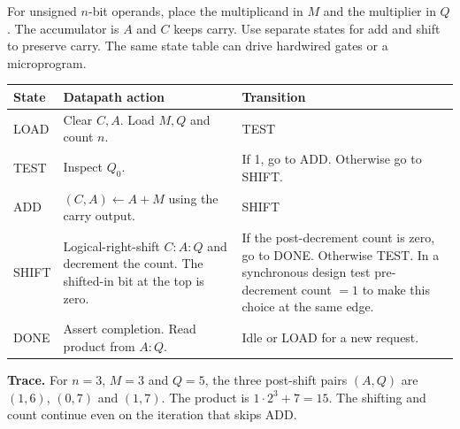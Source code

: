 \documentclass[12pt,a4paper]{article}
\begin{document}
For unsigned $n$-bit operands, place the multiplicand in $M$ and the multiplier in $Q$. The accumulator is $A$ and $C$ keeps carry. Use separate states for add and shift to preserve carry. The same state table can drive hardwired gates or a microprogram.
\par\vspace{6pt}\noindent
\begin{tabularx}{\linewidth}{|B{2.6cm}|Y|Y|}\hline
State & Datapath action & Transition \\ \hline
LOAD & Clear $C,A$. Load $M,Q$ and count $n$. & TEST \\ \hline
TEST & Inspect $Q_0$. & If 1, go to ADD. Otherwise go to SHIFT. \\ \hline
ADD & $(C,A)\leftarrow A+M$ using the carry output. & SHIFT \\ \hline
SHIFT & Logical-right-shift $C:A:Q$ and decrement the count. The shifted-in bit at the top is zero. & If the post-decrement count is zero, go to DONE. Otherwise TEST. In a synchronous design test pre-decrement count $=1$ to make this choice at the same edge. \\ \hline
DONE & Assert completion. Read product from $A:Q$. & Idle or LOAD for a new request. \\ \hline
\end{tabularx}

\textbf{Trace.} For $n=3$, $M=3$ and $Q=5$, the three post-shift pairs $(A,Q)$ are $(1,6)$, $(0,7)$ and $(1,7)$. The product is $1\cdot2^3+7=15$. The shifting and count continue even on the iteration that skips ADD.
\end{document}

